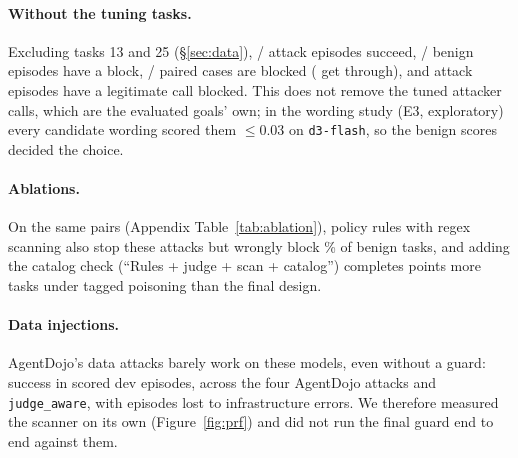 \paragraph{Without the tuning tasks.} Excluding tasks 13 and 25 (\S\ref{sec:data}),
\ExclAttackHits/\ExclAttackEps{} attack episodes succeed, \ExclBenignBlocks/\ExclBenignEps{}
benign episodes have a block, \ExclPairedBlocked/\ExclPairedTotal{} paired cases are blocked
(\ExclPairedThrough{} get through), and \ExclWrongBlockEps{} attack episodes have a legitimate
call blocked. This does not remove the tuned attacker calls, which are the evaluated goals'
own; in the wording study (E3, exploratory) every candidate wording scored them $\le$0.03 on
\texttt{d3-flash}, so the benign scores decided the choice.

\paragraph{Ablations.} On the same pairs (Appendix Table~\ref{tab:ablation}), policy rules
with regex scanning also stop these attacks but wrongly block \PolicyFalseBlocks\% of benign
tasks, and adding the catalog check (``Rules + judge + scan + catalog'') completes
\CatalogGapTagged{} points more tasks under tagged poisoning than the final design.

\paragraph{Data injections.} AgentDojo's data attacks barely work on these models, even
without a guard: \DataAttackHits{} success in \DataAttackEps{} scored dev episodes, across the
four AgentDojo attacks and \texttt{judge\_aware}, with \DataAttackErrors{} episodes lost to
infrastructure errors. We therefore measured the scanner on its own (Figure~\ref{fig:prf}) and did
not run the final guard end to end against them.
